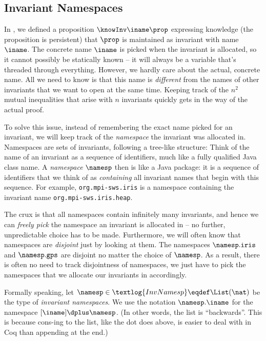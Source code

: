 \subsection{Invariant Namespaces}
\label{sec:namespaces}

In , we defined a proposition $\knowInv\iname\prop$ expressing knowledge (\ie the proposition is persistent) that $\prop$ is maintained as invariant with name $\iname$.
The concrete name $\iname$ is picked when the invariant is allocated, so it cannot possibly be statically known -- it will always be a variable that's threaded through everything.
However, we hardly care about the actual, concrete name.
All we need to know is that this name is \emph{different} from the names of other invariants that we want to open at the same time.
Keeping track of the $n^2$ mutual inequalities that arise with $n$ invariants quickly gets in the way of the actual proof.

To solve this issue, instead of remembering the exact name picked for an invariant, we will keep track of the \emph{namespace} the invariant was allocated in.
Namespaces are sets of invariants, following a tree-like structure:
Think of the name of an invariant as a sequence of identifiers, much like a fully qualified Java class name.
A \emph{namespace} $\namesp$ then is like a Java package: it is a sequence of identifiers that we think of as \emph{containing} all invariant names that begin with this sequence. For example, \texttt{org.mpi-sws.iris} is a namespace containing the invariant name \texttt{org.mpi-sws.iris.heap}.

The crux is that all namespaces contain infinitely many invariants, and hence we can \emph{freely pick} the namespace an invariant is allocated in -- no further, unpredictable choice has to be made.
Furthermore, we will often know that namespaces are \emph{disjoint} just by looking at them.
The namespaces $\namesp.\texttt{iris}$ and $\namesp.\texttt{gps}$ are disjoint no matter the choice of $\namesp$.
As a result, there is often no need to track disjointness of namespaces, we just have to pick the namespaces that we allocate our invariants in accordingly.

Formally speaking, let $\namesp \in \textlog{InvNamesp} \eqdef \List(\nat)$ be the type of \emph{invariant namespaces}.
We use the notation $\namesp.\iname$ for the namespace $[\iname] \dplus \namesp$.
(In other words, the list is ``backwards''. This is because cons-ing to the list, like the dot does above, is easier to deal with in Coq than appending at the end.)

